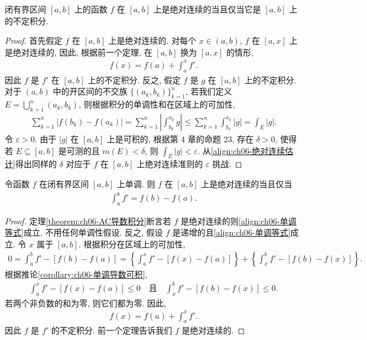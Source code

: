 \documentclass[../../main.tex]{subfiles}
\begin{document}
\begin{theorem}\label{theorem:ch06-AC与不定积分}
闭有界区间 $[a,b]$ 上的函数 $f$ 在 $[a,b]$ 上是绝对连续的当且仅当它是 $[a,b]$ 上的不定积分.
\end{theorem}

\begin{proof}
首先假定 $f$ 在 $[a,b]$ 上是绝对连续的. 对每个 $x\in(a,b)$, $f$ 在 $[a,x]$ 上是绝对连续的, 因此, 根据前一个定理, 在 $[a,b]$ 换为 $[a,x]$ 的情形,
\begin{align*}
f(x)=f(a)+\int_{a}^{x}f'.
\end{align*}
因此 $f$ 是 $f'$ 在 $[a,b]$ 上的不定积分. 反之, 假定 $f$ 是 $g$ 在 $[a,b]$ 上的不定积分. 对于 $(a,b)$ 中的开区间的不交族 $\{(a_{k},b_{k})\}_{k=1}^{n}$, 若我们定义 $E=\bigcup_{k=1}^{n}(a_{k},b_{k})$, 则根据积分的单调性和在区域上的可加性,
\begin{align}
\sum_{k=1}^{n}|f(b_{k})-f(a_{k})|=\sum_{k=1}^{n}\left|\int_{b_{k}}^{a_{k}}g\right|\leqslant\sum_{k=1}^{n}\int_{b_{k}}^{a_{k}}|g|=\int_{E}|g|.\label{align:ch06-绝对连续估计}
\end{align}
令 $\varepsilon>0$. 由于 $|g|$ 在 $[a,b]$ 上是可积的, 根据第 4 章的命题 23, 存在 $\delta>0$, 使得若 $E\subseteq[a,b]$ 是可测的且 $m(E)<\delta$, 则 $\int_{E}|g|<\varepsilon$. 从\eqref{align:ch06-绝对连续估计}得出同样的 $\delta$ 对应于 $f$ 在 $[a,b]$ 上绝对连续准则的 $\varepsilon$ 挑战.
\end{proof}

\begin{corollary}\label{corollary:ch06-单调绝对连续}
令函数 $f$ 在闭有界区间 $[a,b]$ 上单调. 则 $f$ 在 $[a,b]$ 上是绝对连续的当且仅当
\begin{align}
\int_{a}^{b}f'=f(b)-f(a).\label{align:ch06-单调等式}
\end{align}
\end{corollary}

\begin{proof}
定理\cref{theorem:ch06-AC导数积分}断言若 $f$ 是绝对连续的则\eqref{align:ch06-单调等式}成立, 不用任何单调性假设. 反之, 假设 $f$ 是递增的且\eqref{align:ch06-单调等式}成立. 令 $x$ 属于 $[a,b]$. 根据积分在区域上的可加性,
\begin{align*}
0=\int_{a}^{b}f'-[f(b)-f(a)]=\left\{\int_{a}^{x}f'-[f(x)-f(a)]\right\}+\left\{\int_{x}^{b}f'-[f(b)-f(x)]\right\}.
\end{align*}
根据推论\cref{corollary:ch06-单调导数可积},
\begin{align*}
\int_{a}^{x}f'-[f(x)-f(a)]\leqslant 0\quad\text{且}\quad\int_{x}^{b}f'-[f(b)-f(x)]\leqslant 0.
\end{align*}
若两个非负数的和为零, 则它们都为零. 因此,
\begin{align*}
f(x)=f(a)+\int_{a}^{x}f'.
\end{align*}
因此 $f$ 是 $f'$ 的不定积分. 前一个定理告诉我们 $f$ 是绝对连续的.
\end{proof}
\end{document}
